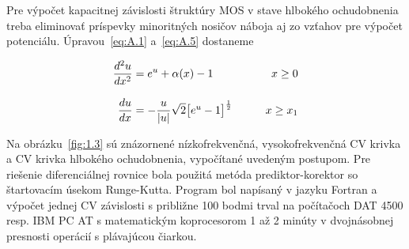 Pre výpočet kapacitnej závislosti štruktúry MOS v stave hlbokého
ochudobnenia treba eliminovať príspevky minoritných nosičov náboja aj
zo vzťahov pre výpočet potenciálu. Úpravou~\ref{eq:A.1} a~\ref{eq:A.5}
dostaneme

\begin{samepage}
\begin{subequations}\label{eq:A.14}
  \begin{align}
  \frac{d^2u}{dx^2} &= {e^u + \alpha(x)-1} \qquad &{x\ge0}                                     \label{eq:A.14a} \\[0.3cm]
  \frac{du}{dx} &= -\frac{u}{|u|} \sqrt{2} \big{[e^u-1\big]}^{\frac{1}{2}} \qquad &{x\ge{x_1}} \label{eq:A.14b}
  \end{align}
\end{subequations}
\end{samepage}

Na obrázku~\ref{fig:1.3} sú znázornené nízkofrekvenčná,
vysokofrekvenčná CV krivka a CV krivka hlbokého ochudobnenia,
vypočítané uvedeným postupom. Pre riešenie diferenciálnej rovnice bola
použitá metóda prediktor-korektor so štartovacím úsekom
Runge-Kutta. Program bol napísaný v jazyku Fortran a výpočet jednej CV
závislosti s približne 100 bodmi trval na počítačoch DAT 4500
resp. IBM PC AT s matematickým koprocesorom 1 až 2 minúty v
dvojnásobnej presnosti operácií s plávajúcou čiarkou.
